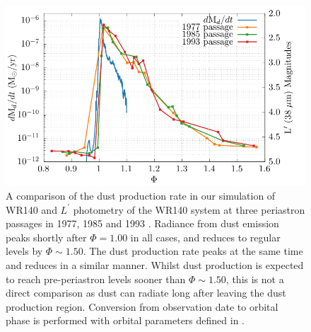 \documentclass[fleqn,usenatbib]{mnras}
\begin{document}
\begin{figure}
  \centering
  \includegraphics[width=\linewidth]{assets/fluxes/magnitudes.pdf}
  \caption[Comparison of simulation dust production rate and $L^\prime$ photometry]{A comparison of the dust production rate in our simulation of WR140 and $L^\prime$ photometry of the WR140 system at three periastron passages in 1977, 1985 and 1993 \citep{crowther_dust_2003}. Radiance from dust emission peaks shortly after $\Phi = 1.00$ in all cases, and reduces to regular levels by $\Phi \sim 1.50$. The dust production rate peaks at the same time and reduces in a similar manner. Whilst dust production is expected to reach pre-periastron levels sooner than $\Phi \sim 1.50$, this is not a direct comparison as dust can radiate long after leaving the dust production region. Conversion from observation date to orbital phase is performed with orbital parameters defined in \cite{fahedSpectroscopyArchetypeCollidingwind2011}.}
  \label{fig:wr140-lprime}
\end{figure}
\end{document}

